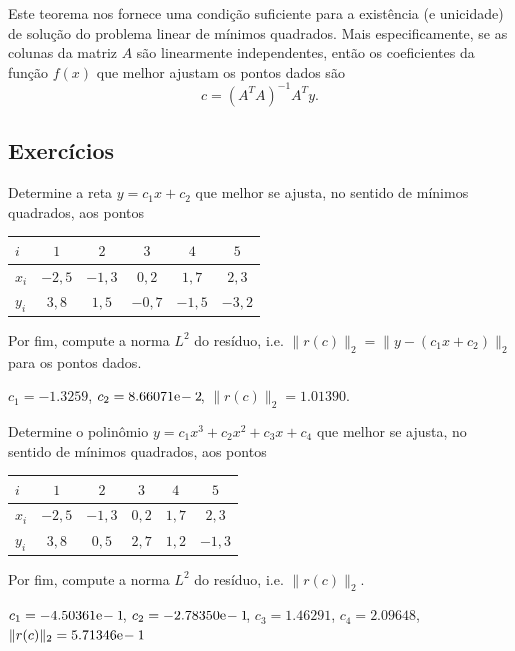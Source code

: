 Este teorema nos fornece uma condição suficiente para a existência (e unicidade) de solução do problema linear de mínimos quadrados. Mais especificamente, se as colunas da matriz $A$ são linearmente independentes, então os coeficientes da função $f(x)$ que melhor ajustam os pontos dados são
\begin{equation}
  c = (A^TA)^{-1}A^Ty.
\end{equation}

\subsection{Exercícios}

\begin{exer}
  Determine a reta $y = c_1x + c_2$ que melhor se ajusta, no sentido de mínimos quadrados, aos pontos
  \begin{center}
    \begin{tabular}{l|ccccc}
      $i$ & $1$ & $2$ & $3$ & $4$ & $5$ \\\hline
      $x_i$ & $-2,5$ & $-1,3$ & $0,2$ & $1,7$ & $2,3$\\
      $y_i$ & $3,8$ & $1,5$ & $-0,7$ & $-1,5$ & $-3,2$\\\hline
    \end{tabular}
  \end{center}
Por fim, compute a norma $L^2$ do resíduo, i.e. $\|r(c)\|_2 = \|y - (c_1x + c_2)\|_2$ para os pontos dados.
\end{exer}
\begin{resp}
  $c_1 = -1.3259$, $c_2 = 8.66071\mathrm{e}\!-2\!$, $\|r(c)\|_2 = 1.01390$.
\end{resp}

\begin{exer}
  Determine o polinômio $y = c_1x^3 + c_2x^2 + c_3x + c_4$ que melhor se ajusta, no sentido de mínimos quadrados, aos pontos
  \begin{center}
    \begin{tabular}{l|ccccc}
      $i$ & $1$ & $2$ & $3$ & $4$ & $5$ \\\hline
      $x_i$ & $-2,5$ & $-1,3$ & $0,2$ & $1,7$ & $2,3$\\
      $y_i$ & $3,8$ & $0,5$ & $2,7$ & $1,2$ & $-1,3$\\\hline
    \end{tabular}
  \end{center}
Por fim, compute a norma $L^2$ do resíduo, i.e. $\|r(c)\|_2$.
\end{exer}
\begin{resp}
  $c_1 = -4.50361\mathrm{e}\!-1\!$, $c_2 = -2.78350\mathrm{e}\!-1\!$, $c_3 = 1.46291$, $c_4 = 2.09648$, $\|r(c)\|_2 = 5.71346\mathrm{e}\!-1\!$
\end{resp}

